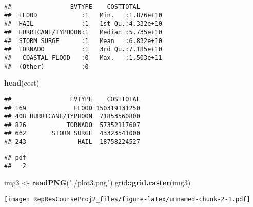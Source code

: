 \documentclass[]{article}
\newenvironment{Shaded}{\begin{snugshade}}{\end{snugshade}}
\newcommand{\KeywordTok}[1]{\textcolor[rgb]{0.13,0.29,0.53}{\textbf{#1}}}
\newcommand{\DataTypeTok}[1]{\textcolor[rgb]{0.13,0.29,0.53}{#1}}
\newcommand{\DecValTok}[1]{\textcolor[rgb]{0.00,0.00,0.81}{#1}}
\newcommand{\StringTok}[1]{\textcolor[rgb]{0.31,0.60,0.02}{#1}}
\newcommand{\OperatorTok}[1]{\textcolor[rgb]{0.81,0.36,0.00}{\textbf{#1}}}
\newcommand{\NormalTok}[1]{#1}
\begin{document}
\begin{verbatim}
##                EVTYPE    COSTTOTAL        
##  FLOOD            :1   Min.   :1.876e+10  
##  HAIL             :1   1st Qu.:4.332e+10  
##  HURRICANE/TYPHOON:1   Median :5.735e+10  
##  STORM SURGE      :1   Mean   :6.832e+10  
##  TORNADO          :1   3rd Qu.:7.185e+10  
##   COASTAL FLOOD   :0   Max.   :1.503e+11  
##  (Other)          :0
\end{verbatim}

\begin{Shaded}
\begin{Highlighting}[]
\KeywordTok{head}\NormalTok{(cost)}
\end{Highlighting}
\end{Shaded}

\begin{verbatim}
##                EVTYPE    COSTTOTAL
## 169             FLOOD 150319131250
## 408 HURRICANE/TYPHOON  71853560800
## 826           TORNADO  57352117607
## 662       STORM SURGE  43323541000
## 243              HAIL  18758224527
\end{verbatim}

\begin{Shaded}
\end{Shaded}

\begin{verbatim}
## pdf 
##   2
\end{verbatim}

\begin{Shaded}
\begin{Highlighting}[]
\NormalTok{  img3 <-}\StringTok{ }\KeywordTok{readPNG}\NormalTok{(}\StringTok{"./plot3.png"}\NormalTok{)}
\NormalTok{  grid}\OperatorTok{::}\KeywordTok{grid.raster}\NormalTok{(img3)}
\end{Highlighting}
\end{Shaded}

\texttt{[image: RepResCourseProj2\_files/figure-latex/unnamed-chunk-2-1.pdf]}
\end{document}
